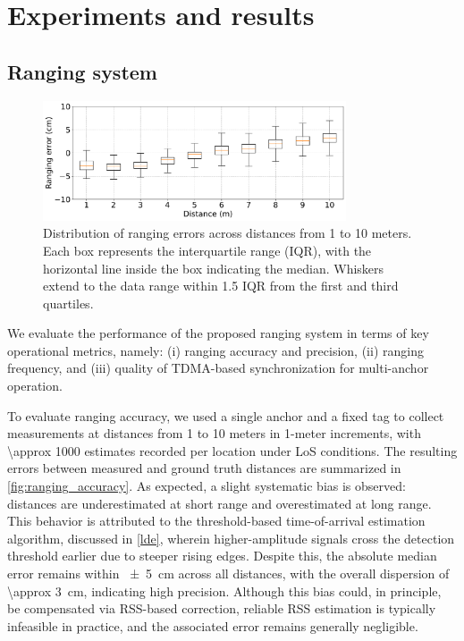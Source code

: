 \chapter{Experiments and results}

\section{Ranging system}\label{ranging_system_results}

\begin{figure}[tbh]
    \centering
    \includegraphics[width=0.8\textwidth]{Figures/experiments_and_results/ranging_accuracy_box.pdf}
    \caption[Distribution of ranging errors.]{Distribution of ranging errors across distances from 1 to 10 meters. Each box represents the interquartile range (IQR), with the horizontal line inside the box indicating the median. Whiskers extend to the data range within 1.5 IQR from the first and third quartiles.}
    \label{fig:ranging_accuracy}
\end{figure}

We evaluate the performance of the proposed ranging system in terms of key operational metrics, namely: (i) ranging accuracy and precision, (ii) ranging frequency, and (iii) quality of TDMA-based synchronization for multi-anchor operation. 

To evaluate ranging accuracy, we used a single anchor and a fixed tag to collect measurements at distances from 1 to 10 meters in 1-meter increments, with \SI{\approx 1000}{} estimates recorded per location under LoS conditions. 
The resulting errors between measured and ground truth distances are summarized in \autoref{fig:ranging_accuracy}. As expected, a slight systematic bias is observed: distances are underestimated at short range and overestimated at long range. This behavior is attributed to the threshold-based time-of-arrival estimation algorithm, discussed in \autoref{lde}, wherein higher-amplitude signals cross the detection threshold earlier due to steeper rising edges. Despite this, the absolute median error remains within \SI{\pm 5}{\centi\metre} across all distances, with the overall dispersion of \SI{\approx 3}{\centi\metre}, indicating high precision. Although this bias could, in principle, be compensated via RSS-based correction, reliable RSS estimation is typically infeasible in practice, and the associated error remains generally negligible.

